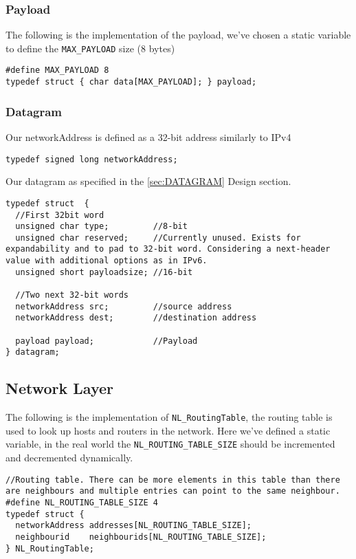 \subsubsection{Payload}
The following is the implementation of the payload, we've chosen a static variable to define the \texttt{MAX\_PAYLOAD} size (8 bytes)
\begin{lstlisting}
#define MAX_PAYLOAD 8
typedef struct { char data[MAX_PAYLOAD]; } payload;
\end{lstlisting}

\subsubsection{Datagram}

Our networkAddress is defined as a 32-bit address similarly to IPv4
\begin{lstlisting}
typedef signed long networkAddress;
\end{lstlisting}


Our datagram as specified in the \ref{sec:DATAGRAM} Design section.

\begin{lstlisting}
typedef struct  {
  //First 32bit word
  unsigned char type;         //8-bit
  unsigned char reserved;     //Currently unused. Exists for expandability and to pad to 32-bit word. Considering a next-header value with additional options as in IPv6.
  unsigned short payloadsize; //16-bit

  //Two next 32-bit words
  networkAddress src;         //source address
  networkAddress dest;        //destination address

  payload payload;            //Payload
} datagram;
\end{lstlisting}

\subsection{Network Layer}

The following is the implementation of \texttt{NL\_RoutingTable}, the routing table is used to look up hosts and routers in the network.
Here we've defined a static variable, in the real world the \texttt{NL\_ROUTING\_TABLE\_SIZE} should be incremented and decremented dynamically.
\begin{lstlisting}
//Routing table. There can be more elements in this table than there are neighbours and multiple entries can point to the same neighbour.
#define NL_ROUTING_TABLE_SIZE 4
typedef struct {
  networkAddress addresses[NL_ROUTING_TABLE_SIZE];
  neighbourid    neighbourids[NL_ROUTING_TABLE_SIZE];
} NL_RoutingTable;
\end{lstlisting}


